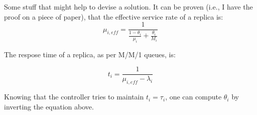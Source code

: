 Some stuff that might help to devise a solution. It can be proven (i.e., I have the proof on a piece of paper), that the effective service rate of a replica is:
$$\mu_{i,eff}=\frac{1}{\frac{1-\theta_i}{\mu_i}+\frac{\theta_i}{M_i}}$$

The respose time of a replica, as per M/M/1 queues, is:

$$t_i=\frac{1}{\mu_{i,eff}-\lambda_i}$$

Knowing that the controller tries to maintain $t_i=\tau_i$, one can compute $\theta_i$ by inverting the equation above.
